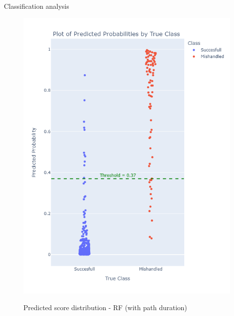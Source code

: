 \documentclass{beamer}
\begin{document}
\begin{frame}{Classification analysis}
\begin{figure}
\begin{minipage}[c]{0.4\linewidth}
    \includegraphics[width=1\textwidth]{Probability_distribution_Model 6.png}\\
    \caption{Predicted score distribution - RF (with path duration)}
\end{minipage}%
\end{figure}
\end{frame}
\end{document}
